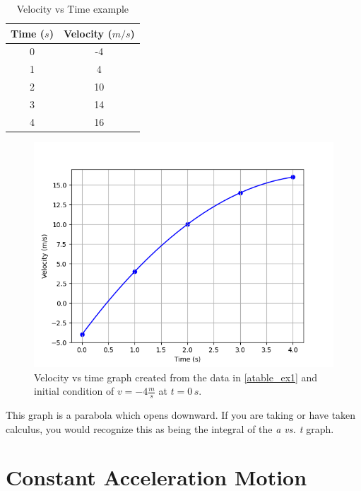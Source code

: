 \documentclass[12pt]{book}
\begin{document}
\begin{exampleblock}
\begin{table}[h]
\large
\centering
\caption{Velocity vs Time example}
\begin{tabular}{| c | c |}
	\hline
	Time ($s$) & Velocity ($m/s$) \\
	\hline
	0 & -4 \\ \hline
	1 & 4 \\ \hline
	2 & 10 \\ \hline
	3 & 14 \\ \hline
	4 & 16 \\ 
	\hline
\end{tabular}
\label{vtable_ex1}
\end{table}



\begin{figure}[h]
\centering
\includegraphics[scale=0.6]{example_vel.png}
\caption{Velocity vs time graph created from the data in \ref{atable_ex1} and initial condition of $v = -4 \frac{m}{s}$ at $t = 0 \, s$.}
\end{figure}

This graph is a parabola which opens downward. If you are taking or have taken calculus, you would recognize this as being the integral of the \textit{a vs. t} graph. 

\end{exampleblock}

\newpage

\section{Constant Acceleration Motion}
\end{document}
